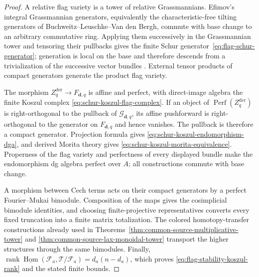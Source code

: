 \documentclass[11pt]{article}
\theoremstyle{definition}
\begin{document}
\begin{proof}
A relative flag variety is a tower of relative Grassmannians.  Efimov's
integral Grassmannian generators, equivalently the characteristic-free
tilting generators of Buchweitz--Leuschke--Van den Bergh, commute with base
change to an arbitrary commutative ring.  Applying them successively in the
Grassmannian tower and tensoring their pullbacks gives the finite Schur
generator~\eqref{eq:flag-schur-generator}; generation is local on the base and
therefore descends from a trivialization of the successive vector bundles
\cite{EfimovGrassmannians,BuchweitzLeuschkeVdBGrass}.  External tensor products
of compact generators generate the product flag variety.

The morphism $Z_q^{\mathrm{der}}\to F_{\mathbf d,q}$ is affine and perfect,
with direct-image algebra the finite Koszul complex
\eqref{eq:schur-koszul-flag-complex}.  If an object of
$\operatorname{Perf}(Z_q^{\mathrm{der}})$ is right-orthogonal to the pullback
of $\mathcal G_{\mathbf d,q}$, its affine pushforward is right-orthogonal to
the generator on $F_{\mathbf d,q}$ and hence vanishes.  The pullback is
therefore a compact generator.  Projection formula gives
\eqref{eq:schur-koszul-endomorphism-dga}, and derived Morita theory gives
\eqref{eq:schur-koszul-morita-equivalence}.  Properness of the flag variety
and perfectness of every displayed bundle make the endomorphism dg algebra
perfect over $A$; all constructions commute with base change.

A morphism between Cech terms acts on their compact generators by a perfect
Fourier--Mukai bimodule.  Composition of the maps gives the cosimplicial
bimodule identities, and choosing finite-projective representatives converts
every fixed truncation into a finite matrix totalization.  The colored
homotopy-transfer constructions already used in
Theorems~\ref{thm:common-source-multiplicative-tower} and
\ref{thm:common-source-lax-monoidal-tower} transport the higher structures
through the same bimodules.  Finally,
$\operatorname{rank}\underline{\operatorname{Hom}}
(\mathcal F_a,\mathcal T/\mathcal F_a)=d_a(n-d_a)$, which proves
\eqref{eq:flag-stability-koszul-rank} and the stated finite bounds.
\end{proof}
\end{document}
